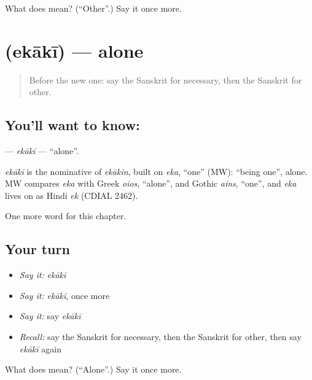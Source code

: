 \begin{tcolorbox}[breakable,colback=teal!4,colframe=teal!35!black,title={Before you move on}]
What does  mean? (\textquotedblleft{}Other\textquotedblright{}.) Say it once more.
\end{tcolorbox}
\section[\texorpdfstring{\sk{एकाकी} (ekākī)}{एकाकी (ekākī)}]{ (ekākī) — alone}

\label{lesson:SA-C244-ekaki}



\begin{quote}
Before the new one: say the Sanskrit for necessary, then the Sanskrit for other.
\end{quote}

\subsection*{You'll want to know: }
\textbf{} — \emph{ekākī} — \textquotedblleft{}alone\textquotedblright{}.

\begin{cousinweb}
\emph{ekākī} is the nominative of \emph{ekākin}, built on \emph{eka}, \textquotedblleft{}one\textquotedblright{} (MW): \textquotedblleft{}being one\textquotedblright{}, alone. MW compares \emph{eka} with Greek \emph{oios}, \textquotedblleft{}alone\textquotedblright{}, and Gothic \emph{ains}, \textquotedblleft{}one\textquotedblright{}, and \emph{eka} lives on as Hindi \emph{ek} (CDIAL 2462).
\end{cousinweb}

\begin{grammarlens}[title={What you've built}]
One more word for this chapter.
\end{grammarlens}

\subsection*{Your turn}
\begin{itemize}
\raggedright
  \item \emph{Say it:} \emph{ekākī}
  \item \emph{Say it:} \emph{ekākī}, once more
  \item \emph{Say it:} say \emph{ekākī}
  \item \emph{Recall:} say the Sanskrit for necessary, then the Sanskrit for other, then say \emph{ekākī} again
\end{itemize}

\begin{tcolorbox}[breakable,colback=teal!4,colframe=teal!35!black,title={Before you move on}]
What does  mean? (\textquotedblleft{}Alone\textquotedblright{}.) Say it once more.
\end{tcolorbox}
